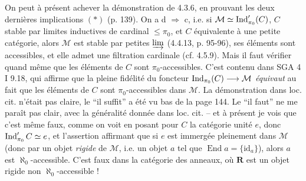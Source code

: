 On peut à présent achever la démonstration de 4.3.6, en prouvant les deux dernières implications $(*)$ (p. 139). On a d $\Longrightarrow$ c, i.e. si $\mathcal{M}\simeq\operatorname{Ind}'_{\pi_0}(C)$, $C$ stable par limites inductives de cardinal $\leqslant\pi_0$, et $C$ équivalente à une petite catégorie, alors $\mathcal{M}$ est stable par petites $\varinjlim$ (4.4.13, p. 95-96), ses éléments sont accessibles, et elle admet une filtration cardinale (cf. 4.5.9). Mais il faut vérifier quand même que les éléments de $C$ sont $\pi_0$-accessibles. C'est contenu dans SGA 4 I 9.18, qui affirme que la pleine fidélité du foncteur $\operatorname{Ind}_{\pi_0}(C)\longrightarrow\mathcal{M}$ \textit{équivaut} au fait que les éléments de $C$ sont $\pi_0$-accessibles dans $\mathcal{M}$. La démonstration dans loc. cit. n'était pas claire, le “il suffit” a été vu bas de la page 144. Le “il faut” ne me paraît pas clair, avec la généralité donnée dans loc. cit. – et à présent je vois que c'est même faux, comme on voit en posant pour $C$ la catégorie unité $e$, donc $\operatorname{Ind}'_{\pi_0}C\simeq e$, et l'assertion affirmant que si $e$ est immergée pleinement dans $\mathcal{M}$ (donc par un objet \textit{rigide} de $\mathcal{M}$, i.e. un objet $a$ tel que $\operatorname{End}a=\{\mathrm{id}_a\}$), alors $a$ est $\aleph_0$-accessible. C'est faux dans la catégorie des anneaux, où $\mathbf{R}$ est un objet rigide non $\aleph_0$-accessible !


